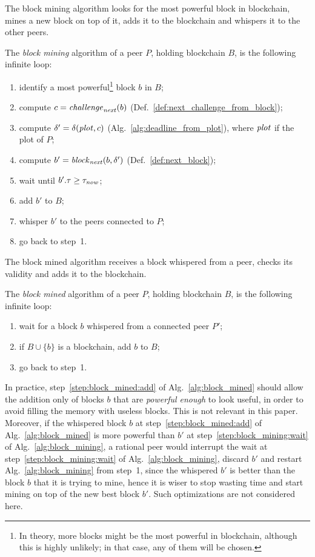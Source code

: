 The block mining algorithm looks for the most powerful block in blockchain,
mines a new block on top of it, adds it to the blockchain and whispers it to the other peers.
%
\begin{alg}\label{alg:block_mining}
  The \emph{block mining} algorithm of a peer $P$, holding blockchain $B$,
  is the following infinite loop:
  \begin{enumerate}
  \item identify a most powerful\footnote{In theory, more blocks might be the most powerful in blockchain, although this is highly unlikely; in that case, any of them will be chosen.} block $b$ in $B$;
  \item compute $c={\mathit{challenge}}_{\mathit{next}}(b)$ (Def.~\ref{def:next_challenge_from_block});
  \item compute $\delta'=\delta({\mathit{plot}},c)$ (Alg.~\ref{alg:deadline_from_plot}), where ${\mathit{plot}}$
    if the plot of $P$;
  \item compute $b'={\mathit{block}}_{\mathit{next}}(b,\delta')$ (Def.~\ref{def:next_block});
  \item\label{step:block_mining:wait} wait until $b'.\tau\ge\tau_{\mathit{now}}$;
  \item\label{step:block_mining:add} add $b'$ to $B$;
  \item whisper $b'$ to the peers connected to $P$;
  \item go back to step~1.
  \end{enumerate}
\end{alg}
%
The block mined algorithm receives a block whispered from a peer, checks its validity
and adds it to the blockchain.
%
\begin{alg}\label{alg:block_mined}
  The \emph{block mined} algorithm of a peer $P$, holding blockchain $B$,
  is the following infinite loop:
  \begin{enumerate}
  \item wait for a block $b$ whispered from a connected peer $P'$;
  \item\label{step:block_mined:add} if $B\cup\{b\}$ is a blockchain, add $b$ to $B$;
  \item go back to step~1.
  \end{enumerate}
\end{alg}
%
In practice, step~\ref{step:block_mined:add} of Alg.~\ref{alg:block_mined} should
allow the addition only of blocks $b$ that are \emph{powerful enough} to look useful,
in order to avoid filling the memory with useless blocks. This is not relevant in this paper.
Moreover, if the whispered block $b$
at step~\ref{step:block_mined:add} of Alg.~\ref{alg:block_mined} is more
powerful than $b'$ at step~\ref{step:block_mining:wait} of Alg.~\ref{alg:block_mining},
a rational peer would interrupt the wait at step~\ref{step:block_mining:wait}
of Alg.~\ref{alg:block_mining}, discard $b'$ and restart Alg.~\ref{alg:block_mining}
from step~1, since the whispered $b'$ is better than the block $b$ that it is trying to mine,
hence it is wiser to stop wasting time and start mining on top of the new best block $b'$.
Such optimizations are not considered here.

